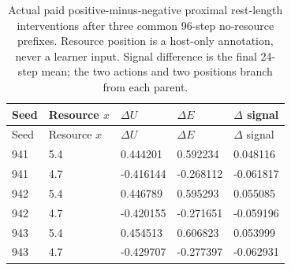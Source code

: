 \begingroup\scriptsize\setlength{\tabcolsep}{3pt}
\begin{longtable}{lllll}
\caption{Actual paid positive-minus-negative proximal rest-length interventions after three common 96-step no-resource prefixes. Resource position is a host-only annotation, never a learner input. Signal difference is the final 24-step mean; the two actions and two positions branch from each parent.}\label{tab:reach-actions}\\
\toprule
Seed & Resource $x$ & $\Delta U$ & $\Delta E$ & $\Delta$ signal\\
\midrule\endfirsthead
\toprule
Seed & Resource $x$ & $\Delta U$ & $\Delta E$ & $\Delta$ signal\\
\midrule\endhead
941 & 5.4 & 0.444201 & 0.592234 & 0.048116\\
941 & 4.7 & -0.416144 & -0.268112 & -0.061817\\
942 & 5.4 & 0.446789 & 0.595293 & 0.055085\\
942 & 4.7 & -0.420155 & -0.271651 & -0.059196\\
943 & 5.4 & 0.454513 & 0.606823 & 0.053999\\
943 & 4.7 & -0.429707 & -0.277397 & -0.062931\\
\bottomrule
\end{longtable}
\endgroup

